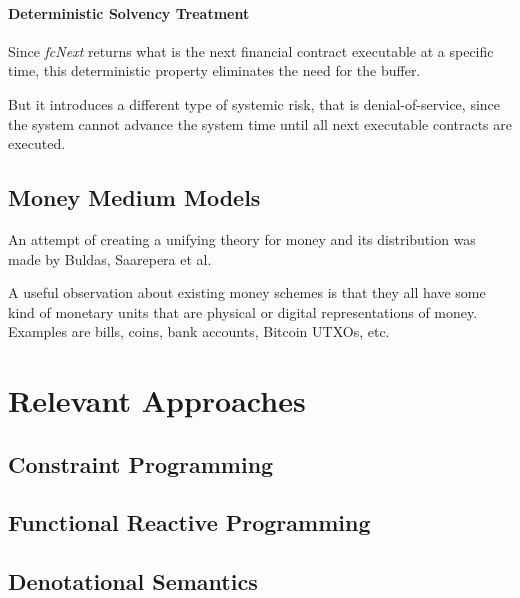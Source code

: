 \documentclass[a4paper,10pt]{report}
\begin{document}
\paragraph{Deterministic Solvency Treatment}

Since \textit{fcNext} returns what is the next financial contract executable at a specific time, this deterministic
property eliminates the need for the buffer.

But it introduces a different type of systemic risk, that is denial-of-service, since the system cannot advance the
system time until all next executable contracts are executed.


\subsection{Money Medium Models}

An attempt of creating a unifying theory for money and its distribution was made by Buldas, Saarepera et
al.\cite{buldas2021unifying}

\begin{displayquote}
A useful observation about existing money schemes is that they all have some kind of monetary units that are physical or
digital representations of money. Examples are bills, coins, bank accounts, Bitcoin UTXOs,
etc. \cite{buldas2021unifying}
\end{displayquote}

\section{Relevant Approaches}

\subsection{Constraint Programming}

\subsection{Functional Reactive Programming}

\subsection{Denotational Semantics}
\end{document}
